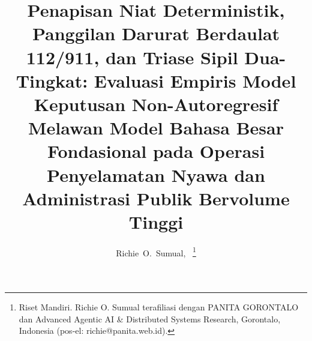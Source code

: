 \documentclass[journal,compsoc]{IEEEtran}
\begin{document}
\title{Penapisan Niat Deterministik, Panggilan Darurat Berdaulat 112/911, dan Triase Sipil Dua-Tingkat: Evaluasi Empiris Model Keputusan Non-Autoregresif Melawan Model Bahasa Besar Fondasional pada Operasi Penyelamatan Nyawa dan Administrasi Publik Bervolume Tinggi}

\author{Richie~O.~Sumual,~%
\thanks{Riset Mandiri. Richie O. Sumual terafiliasi dengan PANITA GORONTALO dan Advanced Agentic AI \& Distributed Systems Research, Gorontalo, Indonesia (pos-el: richie@panita.web.id).}}

%

\IEEEtitleabstractindextext{%
\begin{abstract}

\end{abstract}}
\end{document}
